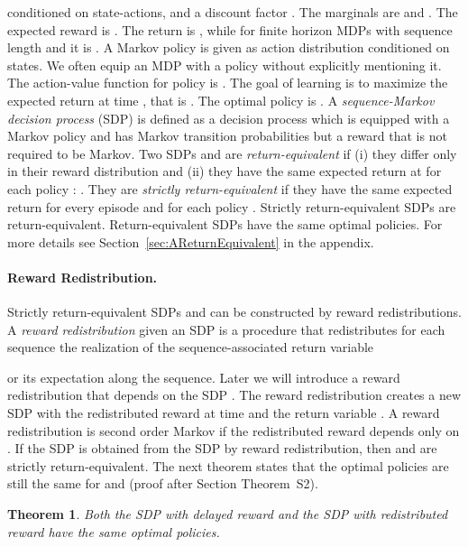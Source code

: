 \documentclass{article}
\newtheorem{theorem}{Theorem}
\begin{document}
conditioned on state-actions, and a discount factor .
The marginals are  and 
.
The expected reward is .
The return  is ,
while for finite horizon MDPs with sequence
length  and  it is .
A Markov policy is given as
action distribution  conditioned on
states.
We often equip an MDP  with a policy  
without explicitly mentioning it. 
The action-value function  for policy  is 
.
The goal of learning is to maximize the expected return at time ,
that is .
The optimal policy  is .
A {\em sequence-Markov decision process} (SDP) is defined 
as a decision process which is equipped with a Markov policy
and has Markov transition probabilities
but a reward that is not required to be Markov.
Two SDPs  and 
are {\em return-equivalent} if
(i) they differ only in their reward distribution  
and (ii) they
have the same expected return at  for each policy :
. 
They are {\em strictly return-equivalent} if
they have the same expected return for every episode and
for each policy .
Strictly return-equivalent SDPs are return-equivalent.
Return-equivalent SDPs have the same optimal policies.
For more details see Section~\ref{sec:AReturnEquivalent} in the appendix.



\paragraph{Reward Redistribution.}
Strictly return-equivalent SDPs  and 
can be constructed by reward redistributions.
A {\em reward redistribution} given an SDP  
is a procedure that redistributes 
for each sequence  the realization of 
the sequence-associated return variable 
 
or its expectation along the sequence. 
Later we will introduce a reward redistribution that 
depends on the SDP .
The reward redistribution creates a new SDP  with
the redistributed reward  at time  and the return variable
. 
A reward redistribution is second order Markov if
the redistributed reward  depends only on . 
If the SDP  is obtained from the 
SDP  by reward redistribution, 
then  and  are strictly return-equivalent.
The next theorem states that the optimal policies are still the same 
for  and  (proof after Section Theorem~S2). 
\begin{theorem}
\label{th:EquivT}
Both the SDP  
with delayed reward 
and the SDP  with redistributed reward  
have the same optimal policies.
\end{theorem}
\end{document}
